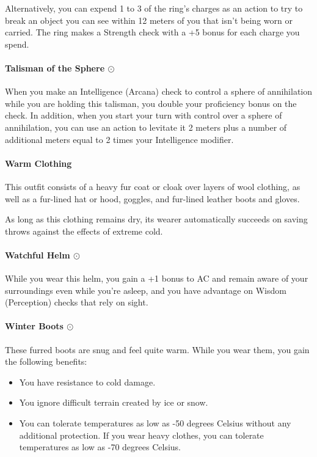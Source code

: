         Alternatively, you can expend 1 to 3 of the ring's charges as an action to try to break an object you can see within 12 meters of you that isn't being worn or carried.
        The ring makes a Strength check with a +5 bonus for each charge you spend.
    \paragraph{Talisman of the Sphere $\odot$}
        When you make an Intelligence (Arcana) check to control a sphere of annihilation while you are holding this talisman, you double your proficiency bonus on the check.
        In addition, when you start your turn with control over a sphere of annihilation, you can use an action to levitate it 2 meters plus a number of additional meters equal to 2 times your Intelligence modifier.
    \paragraph{Warm Clothing}
        This outfit consists of a heavy fur coat or cloak over layers of wool clothing, as well as a fur-lined hat or hood, goggles, and fur-lined leather boots and gloves.

        As long as this clothing remains dry, its wearer automatically succeeds on saving throws against the effects of extreme cold.
    \paragraph{Watchful Helm $\odot$}
        While you wear this helm, you gain a +1 bonus to AC and remain aware of your surroundings even while you're asleep, and you have advantage on Wisdom (Perception) checks that rely on sight.
    \paragraph{Winter Boots $\odot$}
        These furred boots are snug and feel quite warm.
        While you wear them, you gain the following benefits:
        \begin{itemize}
            \item You have resistance to cold damage.
            \item You ignore difficult terrain created by ice or snow.
            \item You can tolerate temperatures as low as -50 degrees Celsius without any additional protection.
            If you wear heavy clothes, you can tolerate temperatures as low as -70 degrees Celsius.
        \end{itemize}
\newpage~\newpage
